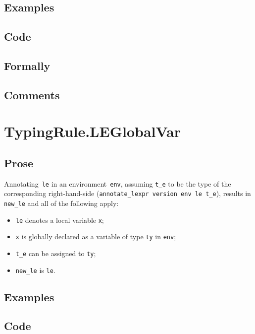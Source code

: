 \documentclass{book}
\begin{document}
  \subsection{Examples}

  \subsection{Code}

  \subsection{Formally}

  \subsection{Comments}

\section{TypingRule.LEGlobalVar \label{sec:TypingRule.LEGlobalVar}}

  \subsection{Prose}
   Annotating~\texttt{le} in an environment~\texttt{env}, assuming
\texttt{t\_e} to be the type of the corresponding right-hand-side
(\texttt{annotate\_lexpr version env le t\_e}), results in \texttt{new\_le} and
all of the following apply:
   \begin{itemize}
   \item \texttt{le} denotes a local variable \texttt{x};
   \item \texttt{x} is globally declared as a variable of type \texttt{ty} in \texttt{env};
   \item \texttt{t\_e} can be assigned to \texttt{ty};
   \item \texttt{new\_le} is \texttt{le}.
   \end{itemize}
 
  \subsection{Examples}

  \subsection{Code}
\end{document}
